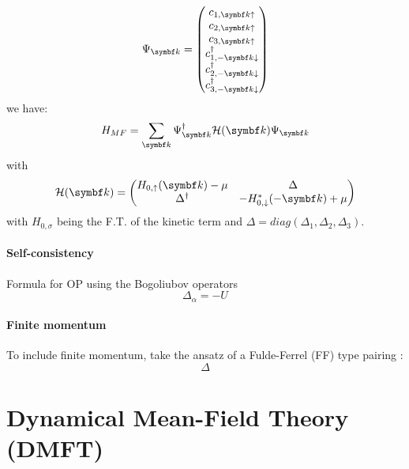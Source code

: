 \documentclass[../notes.tex]{subfiles}
\begin{document}
\begin{equation}
	\Psi_{\vb{k}} =
	\begin{pmatrix}
		c_{1, \vb{k} \uparrow} \\
		c_{2, \vb{k} \uparrow} \\
		c_{3, \vb{k} \uparrow} \\
		c_{1, -\vb{k} \downarrow}^{\dagger} \\
		c_{2, -\vb{k} \downarrow}^{\dagger} \\
		c_{3, -\vb{k} \downarrow}^{\dagger} \\
	\end{pmatrix}
\end{equation}
we have:
\begin{equation}
	H_{MF} = \sum_{\vb{k}} \Psi_{\vb{k}}^{\dagger} \mathcal{H} (\vb{k}) \Psi_{\vb{k}}
\end{equation}
with
\begin{equation}
	\mathcal{H} (\vb{k}) =
	\begin{pmatrix}
		H_{0, \uparrow} (\vb{k}) - \mu & \Delta \\
		\Delta^{\dagger} & - H_{0, \downarrow}^* (-\vb{k}) + \mu
	\end{pmatrix}
\end{equation}
with \(H_{0, \sigma}\) being the F.T. of the kinetic term and \(\Delta = diag(\Delta_1, \Delta_2, \Delta_3)\).


\paragraph{Self-consistency}

Formula for OP using the Bogoliubov operators
\begin{equation}
	\Delta_{\alpha} = -U
\end{equation}


\paragraph{Finite momentum}

To include finite momentum, take the ansatz of a Fulde-Ferrel (FF) type pairing \cite{kinnunenFuldeFerrellLarkin2018}:
\begin{equation}
	\Delta
\end{equation}


\section{Dynamical Mean-Field Theory (DMFT)}\label{sec:Dynamical Mean-Field Theory}
\end{document}
